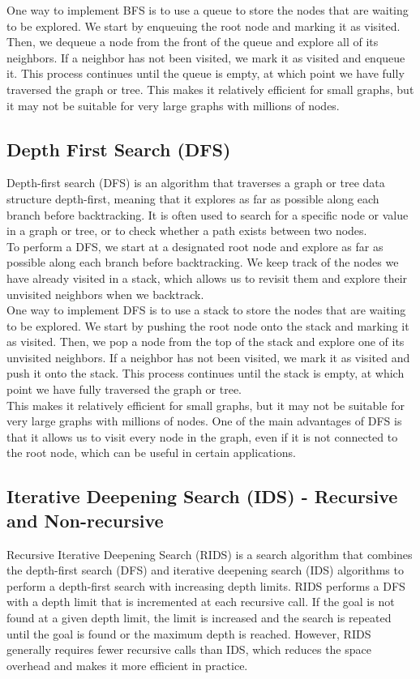 \documentclass[12pt]{article}
\begin{document}
One way to implement BFS is to use a queue to store the nodes that are waiting to be explored. We start by enqueuing the root node and marking it as visited. Then, we dequeue a node from the front of the queue and explore all of its neighbors. If a neighbor has not been visited, we mark it as visited and enqueue it. This process continues until the queue is empty, at which point we have fully traversed the graph or tree. This makes it relatively efficient for small graphs, but it may not be suitable for very large graphs with millions of nodes.

\subsection{Depth First Search (DFS)}
Depth-first search (DFS) is an algorithm that traverses a graph or tree data structure depth-first, meaning that it explores as far as possible along each branch before backtracking. It is often used to search for a specific node or value in a graph or tree, or to check whether a path exists between two nodes. \\

To perform a DFS, we start at a designated root node and explore as far as possible along each branch before backtracking. We keep track of the nodes we have already visited in a stack, which allows us to revisit them and explore their unvisited neighbors when we backtrack.\\

One way to implement DFS is to use a stack to store the nodes that are waiting to be explored. We start by pushing the root node onto the stack and marking it as visited. Then, we pop a node from the top of the stack and explore one of its unvisited neighbors. If a neighbor has not been visited, we mark it as visited and push it onto the stack. This process continues until the stack is empty, at which point we have fully traversed the graph or tree.\\

This makes it relatively efficient for small graphs, but it may not be suitable for very large graphs with millions of nodes. One of the main advantages of DFS is that it allows us to visit every node in the graph, even if it is not connected to the root node, which can be useful in certain applications.

\subsection{Iterative Deepening Search (IDS) - Recursive and Non-recursive}
Recursive Iterative Deepening Search (RIDS) is a search algorithm that combines the depth-first search (DFS) and iterative deepening search (IDS) algorithms to perform a depth-first search with increasing depth limits. RIDS performs a DFS with a depth limit that is incremented at each recursive call. If the goal is not found at a given depth limit, the limit is increased and the search is repeated until the goal is found or the maximum depth is reached. However, RIDS generally requires fewer recursive calls than IDS, which reduces the space overhead and makes it more efficient in practice.\\
\end{document}
